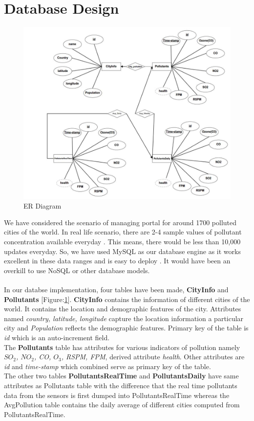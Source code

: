 \documentclass[twocolumn]{article}
\begin{document}
\section{Database Design}
\begin{figure}[t]
	\centering
	\hspace*{-1.8cm}\includegraphics[width=1.2\columnwidth]{er2.jpg}
	\caption{ER Diagram}
	\label{fig:block}
\end{figure}
We have considered the scenario of managing portal for around 1700 polluted cities of the world. In real life scenario, there are 2-4 sample values of pollutant concentration available everyday \cite{cpcb}. This means, there would be less than 10,000 updates everyday. So, we have used MySQL as our database engine as it works excellent in these data ranges and is easy to  deploy \cite{mysql}. It would have been an overkill to use NoSQL or other database models.\\
\\
In our databse implementation, four tables have been made, \textbf{CityInfo} and \textbf{Pollutants} [Figure:\ref{fig:block}]. \textbf{CityInfo} contains the information of different cities of the world. It contains the location and demographic features of the city. Attributes named \textit{country, latitude, longitude} capture the location information a particular city and \textit{Population} reflects the demographic features. Primary key of the table is \textit{id} which is an auto-increment field.    \\ 
The \textbf{Pollutants} table has attributes for various indicators of pollution namely \textit{$SO_2$, $NO_2$, CO, $O_3$, RSPM, FPM}, derived attribute \textit{health}. Other attributes are  \textit{id} and \textit{time-stamp} which combined serve as primary key of the table.\\ The other two tables \textbf{PollutantsRealTime} and \textbf{PollutantsDaily} have same attributes as Pollutants table with the difference that the real time pollutants data from the sensors is first dumped into PollutantsRealTime whereas the AvgPollution table contains the daily average of different cities computed from PollutantsRealTime.
\end{document}
